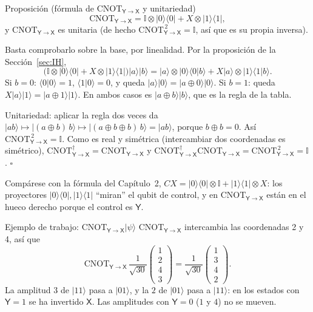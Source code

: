 \documentclass[11pt, a4paper, twoside, openright]{report}
\providecommand{\ket}[1]{|#1\rangle}
\providecommand{\bra}[1]{\langle #1|}
\newcommand{\X}{\mathsf{X}}
\newcommand{\Y}{\mathsf{Y}}
\newcommand{\CYX}{\mathrm{CNOT}_{\Y\to\X}}
\newcommand{\I}{\mathbb{I}}
\begin{document}
\begin{teoria}{Proposición (fórmula de $\CYX$ y unitariedad)}
\[
\CYX = \I\otimes\ket0\bra0 + X\otimes\ket1\bra1,
\]
y $\CYX$ es unitaria (de hecho $\CYX^{\,2}=\I$, así que es su propia inversa).
\end{teoria}

\begin{demo}
Basta comprobarlo sobre la base, por linealidad. Por la proposición de la Sección~\ref{sec:IH},
\[
\big(\I\otimes\ket0\bra0 + X\otimes\ket1\bra1\big)\ket a\ket b
= \ket a\otimes\ket0\langle0|b\rangle + X\ket a\otimes\ket1\langle1|b\rangle.
\]
Si $b=0$: $\langle0|0\rangle=1$, $\langle1|0\rangle=0$, y queda $\ket a\ket0=\ket{a\oplus0}\ket0$. Si $b=1$: queda $X\ket a\ket1=\ket{a\oplus1}\ket1$. En ambos casos es $\ket{a\oplus b}\ket b$, que es la regla de la tabla.

Unitariedad: aplicar la regla dos veces da $\ket{ab}\mapsto\ket{(a\oplus b)\,b}\mapsto\ket{(a\oplus b\oplus b)\,b}=\ket{ab}$, porque $b\oplus b=0$. Así $\CYX^{\,2}=\I$. Como es real y simétrica (intercambiar dos coordenadas es simétrico), $\CYX^\dagger=\CYX$ y $\CYX^\dagger\CYX=\CYX^{\,2}=\I$. \hfill$\square$

\smallskip
Compárese con la fórmula del Capítulo~2, $CX=\ket0\bra0\otimes\I+\ket1\bra1\otimes X$: los proyectores $\ket0\bra0,\ket1\bra1$ ``miran'' el qubit de control, y en $\CYX$ están en el hueco derecho porque el control es $\Y$.
\end{demo}

\begin{ejemplo}{Ejemplo de trabajo: $\CYX\ket\psi$}
$\CYX$ intercambia las coordenadas 2 y 4, así que
\[
\CYX\,\frac{1}{\sqrt{30}}\begin{pmatrix}1\\2\\4\\3\end{pmatrix} = \frac{1}{\sqrt{30}}\begin{pmatrix}1\\3\\4\\2\end{pmatrix}.
\]
La amplitud $3$ de $\ket{11}$ pasa a $\ket{01}$, y la $2$ de $\ket{01}$ pasa a $\ket{11}$: en los estados con $\Y=1$ se ha invertido $\X$. Las amplitudes con $\Y=0$ ($1$ y $4$) no se mueven.
\end{ejemplo}

\cleardoublepage
\end{document}
